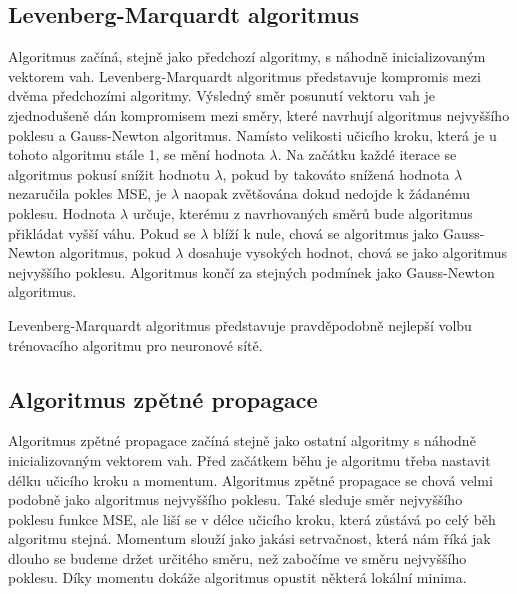 \documentclass[11pt,twoside,a4paper]{book}
\begin{document}
\subsection{Levenberg-Marquardt algoritmus}
Algoritmus začíná, stejně jako předchozí algoritmy, s náhodně inicializovaným vektorem vah. Levenberg-Marquardt algoritmus představuje kompromis mezi dvěma předchozími algoritmy. Výsledný směr posunutí vektoru vah je zjednodušeně dán kompromisem mezi směry, které navrhují algoritmus nejvyššího poklesu a Gauss-Newton algoritmus.  Namísto velikosti učicího kroku, která je u tohoto algoritmu stále 1, se mění hodnota \begin{math}\lambda\end{math}. Na začátku každé iterace se algoritmus pokusí snížit hodnotu \begin{math}\lambda\end{math}, pokud by takováto snížená hodnota \begin{math}\lambda\end{math} nezaručila pokles MSE, je \begin{math}\lambda\end{math} naopak zvětšována dokud nedojde k žádanému poklesu. Hodnota \begin{math}\lambda\end{math} určuje, kterému z navrhovaných směrů bude algoritmus přikládat vyšší váhu. Pokud se \begin{math}\lambda\end{math} blíží k nule, chová se algoritmus jako Gauss-Newton algoritmus, pokud \begin{math}\lambda\end{math} dosahuje vysokých hodnot, chová se jako algoritmus nejvyššího poklesu. Algoritmus končí za stejných podmínek jako Gauss-Newton algoritmus.\cite{nndocumentation}\cite{learningmachines} 

Levenberg-Marquardt algoritmus představuje pravděpodobně nejlepší volbu trénovacího algoritmu pro neuronové sítě.

\subsection{Algoritmus zpětné propagace}
Algoritmus zpětné propagace začíná stejně jako ostatní algoritmy s náhodně inicializovaným vektorem vah. Před začátkem běhu je algoritmu třeba nastavit délku učicího kroku a momentum. Algoritmus zpětné propagace se chová velmi podobně jako algoritmus nejvyššího poklesu. Také sleduje směr nejvyššího poklesu funkce MSE, ale liší se v délce učicího kroku, která zůstává po celý běh algoritmu stejná. Momentum slouží jako jakási setrvačnost, která nám říká jak dlouho se budeme držet určitého směru, než zabočíme ve směru nejvyššího poklesu. Díky momentu dokáže algoritmus opustit některá lokální minima. 
\end{document}

